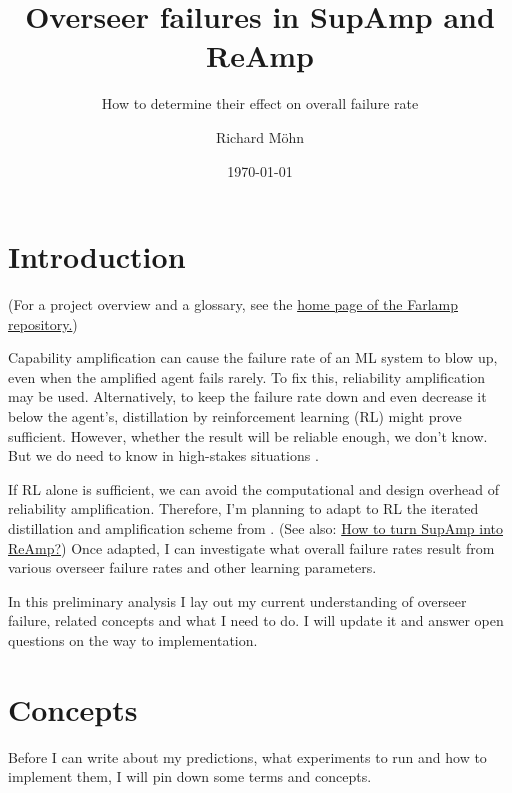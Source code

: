 \documentclass{farlamp}
\title{Overseer failures in SupAmp and ReAmp}
\subtitle{How to determine their effect on overall failure rate}
\author{Richard Möhn}
\date{\today}
\begin{document}
\maketitle
\tableofcontents

\section{Introduction}

(For a project overview and a glossary, see the
\href{https://github.com/rmoehn/farlamp}{home page of the Farlamp
repository.})

Capability amplification can cause the failure rate of an ML system to blow up,
even when the amplified agent fails rarely. To fix this, reliability
amplification may be used. Alternatively, to keep the failure rate down and even
decrease it below the agent's, distillation by reinforcement learning (RL) might
prove sufficient. However, whether the result will be reliable enough, we don't
know.~\parencite{ChriRelAmp} But we do need to know in high-stakes situations
\parencite[see][]{ChriLearnCata}.

If RL alone is sufficient, we can avoid the computational and design overhead of
reliability amplification. Therefore, I'm planning to adapt to RL the iterated
distillation and amplification scheme from \textcite{CSASupAmp}. (See also:
\href{https://github.com/rmoehn/farlamp/raw/master/supamp-reamp.pdf}{How to turn
SupAmp into ReAmp?}) Once adapted, I can investigate what overall failure rates
result from various overseer failure rates and other learning parameters.

In this preliminary analysis I lay out my current understanding of overseer
failure, related concepts and what I need to do. I will update it and answer
open questions on the way to implementation.


\section{Concepts}

Before I can write about my predictions, what experiments to run and how to
implement them, I will pin down some terms and concepts.

\end{document}
